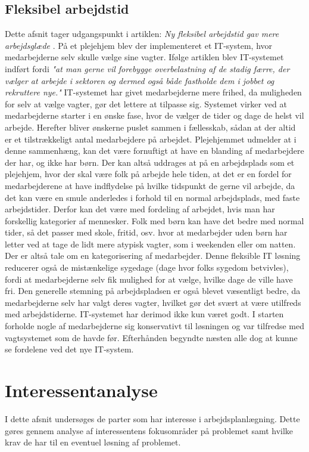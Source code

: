 \subsection{Fleksibel arbejdstid}
\noindent Dette afsnit tager udgangspunkt i artiklen: \textit{Ny fleksibel arbejdstid gav mere arbejdsglæde} \citep{Thomse2014}. På et plejehjem blev der implementeret et IT-system, hvor medarbejderne selv skulle vælge sine vagter. Ifølge artiklen blev IT-systemet indført fordi \textit{"at man gerne vil forebygge overbelastning af de stadig færre, der vælger at arbejde i sektoren og dermed også både fastholde dem i jobbet og rekruttere nye."} IT-systemet har givet medarbejderne mere frihed, da muligheden for selv at vælge vagter, gør det lettere at tilpasse sig. Systemet virker ved at medarbejderne starter i en ønske fase, hvor de vælger de tider og dage de helst vil arbejde. Herefter bliver ønskerne puslet sammen i fællesskab, sådan at der altid er et tilstrækkeligt antal medarbejdere på arbejdet. Plejehjemmet udmelder at i denne sammenhæng, kan det være fornuftigt at have en blanding af medarbejdere der har, og ikke har børn. Der kan altså uddrages at på en arbejdsplads som et plejehjem, hvor der skal være folk på arbejde hele tiden, at det er en fordel for medarbejderene at have indflydelse på hvilke tidspunkt de gerne vil arbejde, da det kan være en smule anderledes i forhold til en normal arbejdsplads, med faste arbejdstider. Derfor kan det være med fordeling af arbejdet, hvis man har forskellig kategorier af mennesker. Folk med børn kan have det bedre med normal tider, så det passer med skole, fritid, osv. hvor at medarbejder uden børn har letter ved at tage de lidt mere atypisk vagter, som i weekenden eller om natten. Der er altså tale om en kategorisering af medarbejder. Denne fleksible IT løsning reducerer også de mistænkelige sygedage (dage hvor folks sygedom betvivles), fordi at medarbejderne selv fik mulighed for at vælge, hvilke dage de ville have fri. Den generelle stemning på arbejdspladsen er også blevet væsentligt bedre, da medarbejderne selv har valgt deres vagter, hvilket gør det svært at være utilfreds med arbejdstiderne. 
IT-systemet har derimod ikke kun været godt. I starten forholde nogle af medarbejderne sig konservativt til løsningen og var tilfredse med vagtsystemet som de havde før. Efterhånden begyndte næsten alle dog at kunne se fordelene ved det nye IT-system.

\section{Interessentanalyse}
I dette afsnit undersøges de parter som har interesse i arbejdsplanlægning. Dette gøres gennem analyse af interessentens fokusområder på problemet samt hvilke krav de har til en eventuel løsning af problemet.


